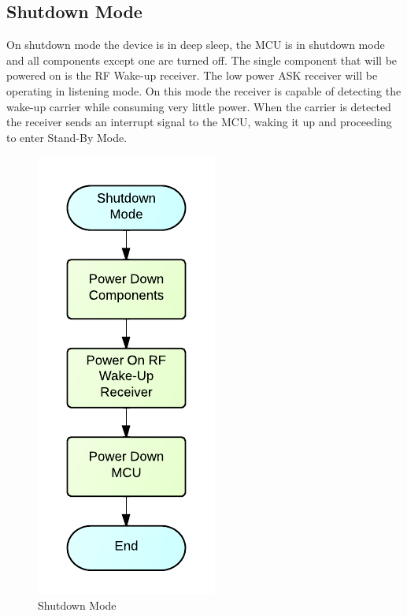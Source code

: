 \subsection{Shutdown Mode}
On shutdown mode the device is in deep sleep, the MCU is in shutdown mode and all components except one are turned off. The single component that will be powered on is the RF Wake-up receiver. The low power ASK receiver will be operating in listening mode. On this mode the receiver is capable of detecting the wake-up carrier while consuming very little power. When the carrier is detected the receiver sends an interrupt signal to the MCU, waking it up and proceeding to enter Stand-By Mode.
\begin{figure}[H]
	\centering
	\includegraphics[scale=1.0]{img/ShutdownMode}
	\caption{Shutdown Mode \label{fig:shutdownMode}}
\end{figure}


